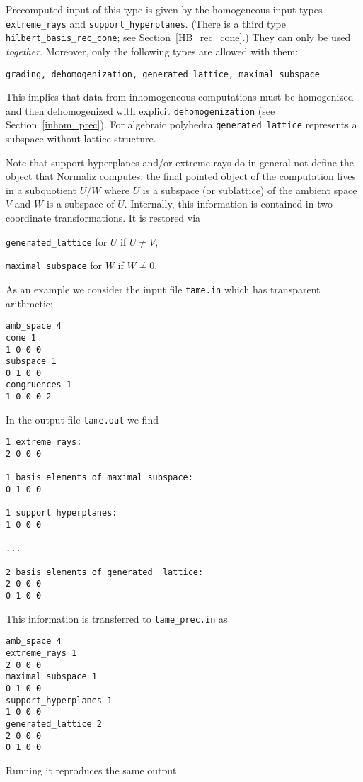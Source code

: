 Precomputed input of this type is given by the homogeneous input types \verb|extreme_rays| and \verb|support_hyperplanes|. (There is a third type \verb|hilbert_basis_rec_cone|; see Section~\ref{HB_rec_cone}.) They can only be used \emph{together}. Moreover, only the following types are allowed with them:
\begin{center}
	\verb|grading, dehomogenization, generated_lattice, maximal_subspace|
\end{center}
This implies that data from inhomogeneous computations must be homogenized and then dehomogenized with explicit \verb|dehomogenization| (see Section~\ref{inhom_prec}). For algebraic polyhedra \verb|generated_lattice| represents a subspace without lattice structure.

Note that support hyperplanes and/or extreme rays do in general not define the object that Normaliz computes: the final pointed object of the computation lives in a subquotient $U/W$ where $U$ is a subspace (or sublattice) of the ambient space $V$ and $W$ is a subspace of $U$. Internally, this information is contained in two coordinate transformations. It is restored via
\begin{arab}
	\item \verb|generated_lattice| for $U$ if $U\neq V$,
	\item \verb|maximal_subspace| for $W$ if $W\neq 0$.
\end{arab}

As an example we consider the input file \verb|tame.in| which has transparent arithmetic:
\begin{Verbatim}
amb_space 4
cone 1
1 0 0 0
subspace 1
0 1 0 0
congruences 1
1 0 0 0 2
\end{Verbatim}
In the output file \verb|tame.out| we find
\begin{Verbatim}
1 extreme rays:
2 0 0 0

1 basis elements of maximal subspace:
0 1 0 0

1 support hyperplanes:
1 0 0 0

...

2 basis elements of generated  lattice:
2 0 0 0
0 1 0 0
\end{Verbatim}
This information is transferred to \verb|tame_prec.in| as
\begin{Verbatim}
amb_space 4
extreme_rays 1
2 0 0 0
maximal_subspace 1
0 1 0 0
support_hyperplanes 1
1 0 0 0
generated_lattice 2
2 0 0 0
0 1 0 0
\end{Verbatim}
Running it reproduces the same output.

